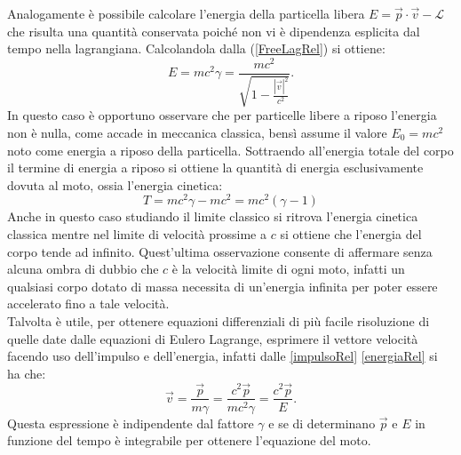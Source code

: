 Analogamente è possibile calcolare l'energia della particella libera $E = \vec{p}\cdot\vec{v}-\mathcal{L} $ che risulta una quantità conservata poiché non vi è dipendenza esplicita dal tempo nella lagrangiana. Calcolandola dalla (\ref{FreeLagRel}) si ottiene:
\begin{equation}
    E = mc^2\gamma=\frac{mc^2}{\sqrt{1-\frac{|\vec{v}|^2}{c^2}}}.\label{energiaRel}
\end{equation}
In questo caso è opportuno osservare che per particelle libere a riposo l'energia non è nulla, come accade in meccanica classica, bensì assume il valore $E_0=mc^2$ noto come energia a riposo della particella. Sottraendo all'energia totale del corpo il termine di energia a riposo si ottiene la quantità di energia esclusivamente dovuta al moto, ossia l'energia cinetica:
\begin{equation}
    T=mc^2\gamma-mc^2=mc^2(\gamma-1)
\end{equation}
Anche in questo caso studiando il limite classico si ritrova l'energia cinetica classica mentre nel limite di velocità prossime a $c$ si ottiene che l'energia del corpo tende ad infinito. Quest'ultima osservazione consente di affermare senza alcuna ombra di dubbio che $c$ è la velocità limite di ogni moto, infatti un qualsiasi corpo dotato di massa necessita di un'energia infinita per poter essere accelerato fino a tale velocità.\\

Talvolta è utile, per ottenere equazioni differenziali di più facile risoluzione di quelle date dalle equazioni di Eulero Lagrange, esprimere il vettore velocità facendo uso dell'impulso e dell'energia, infatti dalle \eqref{impulsoRel} \eqref{energiaRel} si ha che:
\begin{equation}
    \vec v=\frac{\vec p}{m\gamma}=\frac{c^2\vec p}{mc^2\gamma}=\frac{c^2\vec p}{E}.\label{velPE}
\end{equation}    
Questa espressione è indipendente dal fattore $\gamma$ e se di determinano $\vec p$ e $E$ in funzione del tempo è integrabile per ottenere l'equazione del moto.\\


